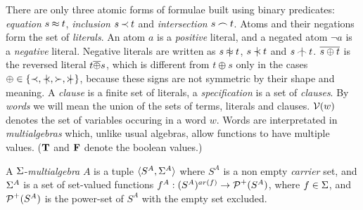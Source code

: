 There are only three atomic forms of formulae built using binary predicates: 
{\em equation} $s\mathbin{\approx} t$, {\em inclusion} $s\mathbin{\prec} t$ and {\em intersection} 
$s\mathbin{\frown} t$. Atoms and their negations form the set of {\em literals}. An atom 
$a$ is a {\em positive} literal, and a negated atom $\neg a$ is a {\em 
negative} literal. Negative literals are written as $s\notEq t$, 
$s\notIncl t$ and $s\notInt t$.  \(\overline{s\oplus t}\) is the reversed literal
\(t\overline{\oplus} s\), which is different from \(t\oplus s\) only in
the cases \(\oplus\in\{\Incl,\notIncl,\Cont,\notCont\}\), because these signs
are not symmetric by their shape and meaning.
A {\em clause} is a finite set of literals,
a {\em specification} is a set of {\em
clauses}.  
%
%
By {\em words} we will mean the union of the sets of terms, literals and
clauses.  \({\cal V}(w)\) denotes the set of variables occuring in a word $w$.
%
%
Words are interpretated in {\em multialgebras}
\cite{Kap,Hus,Mich} which, unlike usual algebras, allow
functions to have multiple values.
(\(\bf T\) and  \(\bf F\) denote the boolean values.)
%

\begin{definition}
A $\Sigma$-{\em multialgebra} $A$ is a tuple \(\langle S^A,\Sigma^A\rangle\) where
$S^A$ is a non empty {\em carrier} set, and $\Sigma^A$ is a set of
set-valued functions \(f^A: (S^A)^{ar(f)}\to\mbox {$\cal P$}^+(S^A)\), where \(f\in
\Sigma\), and \(\mbox {$\cal P$}^+(S^A)\) is the power-set of \(S^A\) with the empty set
excluded.

 \end{definition}
%

